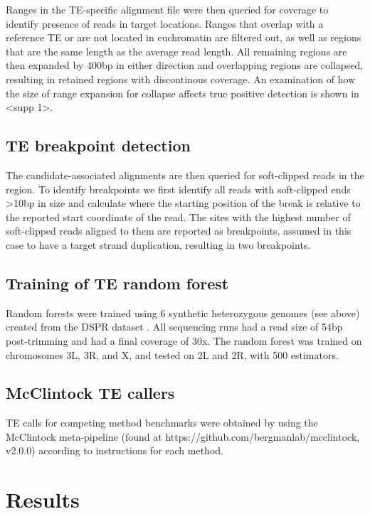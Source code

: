 Ranges in the TE-specific alignment file were then queried for coverage to identify presence of reads in target locations. Ranges that overlap with a reference TE or are not located in euchromatin are filtered out, as well as  regions that are the same length as the average read length. All remaining regions are then expanded by 400bp in either direction and overlapping regions are collapsed, resulting in retained regions with discontinous coverage. An examination of how the size of range expansion for collapse affects true positive detection is shown in <supp 1>. 

\subsection{TE breakpoint detection}

The candidate-associated alignments are then queried for soft-clipped reads in the region. To identify breakpoints we first identify all reads with soft-clipped ends >10bp in size and calculate where the starting position of the break is relative to the reported start coordinate of the read. The sites with the highest number of soft-clipped reads aligned to them are reported as breakpoints, assumed in this case to have a target strand duplication, resulting in two breakpoints.

\subsection{Training of TE random forest}

Random forests were trained using 6 synthetic heterozygous genomes (see above) created from the DSPR dataset \cite{chakrabortyStructuralVariantsExhibit2019}. All sequencing runs had a read size of 54bp post-trimming and had a final coverage of 30x. The random forest was trained on chromosomes 3L, 3R, and X, and tested on 2L and 2R, with 500 estimators.

\subsection{McClintock TE callers}

TE calls for competing method benchmarks were obtained by using the McClintock meta-pipeline (found at https://github.com/bergmanlab/mcclintock, v2.0.0) according to instructions for each method.

\section{Results}

